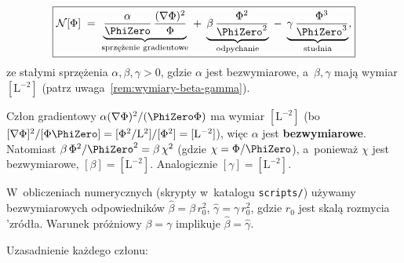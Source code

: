 \begin{definition}[Samointerferencja]\label{def:N}
\begin{equation}\label{eq:N-def}
  \boxed{
    \mathcal{N}[\Phi]
    \;=\;
      \underbrace{\frac{\alpha}{\PhiZero}\,
        \frac{(\nabla\Phi)^2}{\Phi}}_{\text{sprz\k{e}\.zenie gradientowe}}
    \;+\;
      \underbrace{\beta\,\frac{\Phi^2}{\PhiZero^2}}_{\text{odpychanie}}
    \;-\;
      \underbrace{\gamma\,\frac{\Phi^3}{\PhiZero^3}}_{\text{studnia}},
  }
\end{equation}
ze sta\l{}ymi sprz\k{e}\.zenia $\alpha,\beta,\gamma > 0$,
gdzie $\alpha$ jest bezwymiarowe,
a~$\beta,\gamma$ maj\k{a} wymiar $[\mathrm{L}^{-2}]$
(patrz uwaga~\ref{rem:wymiary-beta-gamma}).
\end{definition}

\begin{remark}\label{rem:wymiary-beta-gamma}
Cz\l{}on gradientowy $\alpha(\nabla\Phi)^2/(\PhiZero\Phi)$
ma wymiar $[\mathrm{L}^{-2}]$ (bo $[\nabla\Phi]^2/[\Phi\PhiZero]
= [\Phi^2/\mathrm{L}^2]/[\Phi^2] = [\mathrm{L}^{-2}]$),
wi\k{e}c $\alpha$ jest \textbf{bezwymiarowe}.
Natomiast $\beta\,\Phi^2/\PhiZero^2 = \beta\,\chi^2$ (gdzie
$\chi = \Phi/\PhiZero$), a~poniewa\.z $\chi$ jest bezwymiarowe,
$[\beta] = [\mathrm{L}^{-2}]$. Analogicznie $[\gamma] = [\mathrm{L}^{-2}]$.

W~obliczeniach numerycznych (skrypty w~katalogu \texttt{scripts/})
u\.zywamy bezwymiarowych odpowiednik\'ow
$\hat\beta = \beta\,r_0^2$,
$\hat\gamma = \gamma\,r_0^2$,
gdzie $r_0$ jest skal\k{a} rozmycia \\'zr\'od\l{}a.
Warunek pr\'o\.zniowy $\beta = \gamma$ implikuje $\hat\beta = \hat\gamma$.
\end{remark}

Uzasadnienie ka\.zdego cz\l{}onu:

